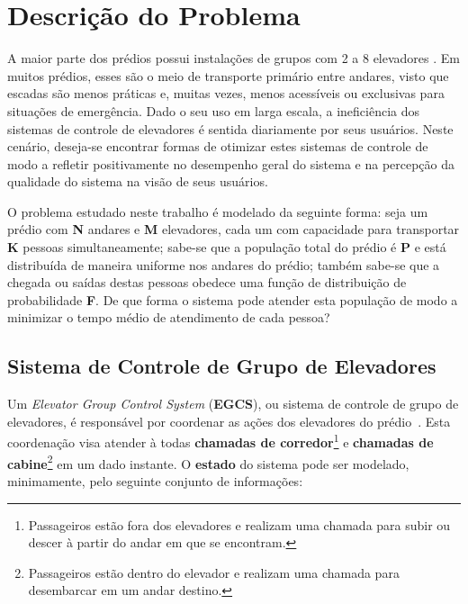 \chapter{\label{chap:problem}Descrição do Problema}

A maior parte dos prédios possui instalações de grupos com 2 a 8 elevadores \cite{KOEHLEROTTIGER02}. Em muitos prédios, esses são o meio de transporte primário entre andares, visto que escadas são menos práticas e, muitas vezes, menos acessíveis ou exclusivas para situações de emergência. Dado o seu uso em larga escala, a ineficiência dos sistemas de controle de elevadores é sentida diariamente por seus usuários. Neste cenário, deseja-se encontrar formas de otimizar estes sistemas de controle de modo a refletir positivamente no desempenho geral do sistema e na percepção da qualidade do sistema na visão de seus usuários.

O problema estudado neste trabalho é modelado da seguinte forma: seja um prédio com \textbf{N} andares e \textbf{M} elevadores, cada um com capacidade para transportar \textbf{K} pessoas simultaneamente; sabe-se que a população total do prédio é \textbf{P} e está distribuída de maneira uniforme nos andares do prédio; também sabe-se que a chegada ou saídas destas pessoas obedece uma função de distribuição de probabilidade \textbf{F}. De que forma o sistema pode atender esta população de modo a minimizar o tempo médio de atendimento de cada pessoa?

\section{Sistema de Controle de Grupo de Elevadores}

Um \textit{Elevator Group Control System} (\textbf{EGCS}), ou sistema de controle de grupo de elevadores, é responsável por coordenar as ações dos elevadores do prédio~\cite{kuzunuki1984elevator}. Esta coordenação visa atender à todas \textbf{chamadas de corredor}\footnote{Passageiros estão fora dos elevadores e realizam uma chamada para subir ou descer à partir do andar em que se encontram.} e \textbf{chamadas de cabine}\footnote{Passageiros estão dentro do elevador e realizam uma chamada para desembarcar em um andar destino.} em um dado instante. O \textbf{estado} do sistema pode ser modelado, minimamente, pelo seguinte conjunto de informações:

